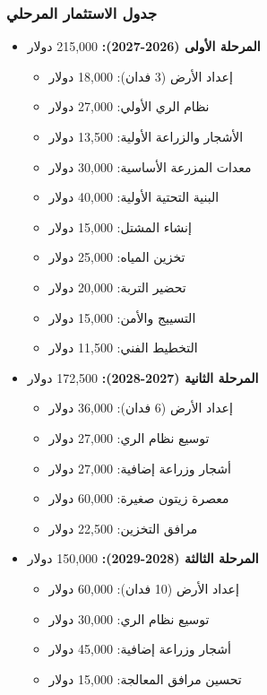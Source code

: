 \subsubsection{جدول الاستثمار المرحلي}
\begin{itemize}
    \item \textbf{المرحلة الأولى (2026-2027):} 215,000 دولار
    \begin{itemize}
        \item إعداد الأرض (3 فدان): 18,000 دولار
        \item نظام الري الأولي: 27,000 دولار
        \item الأشجار والزراعة الأولية: 13,500 دولار
        \item معدات المزرعة الأساسية: 30,000 دولار
        \item البنية التحتية الأولية: 40,000 دولار
        \item إنشاء المشتل: 15,000 دولار
        \item تخزين المياه: 25,000 دولار
        \item تحضير التربة: 20,000 دولار
        \item التسييج والأمن: 15,000 دولار
        \item التخطيط الفني: 11,500 دولار
    \end{itemize}
    
    \item \textbf{المرحلة الثانية (2027-2028):} 172,500 دولار
    \begin{itemize}
        \item إعداد الأرض (6 فدان): 36,000 دولار
        \item توسيع نظام الري: 27,000 دولار
        \item أشجار وزراعة إضافية: 27,000 دولار
        \item معصرة زيتون صغيرة: 60,000 دولار
        \item مرافق التخزين: 22,500 دولار
    \end{itemize}
    
    \item \textbf{المرحلة الثالثة (2028-2029):} 150,000 دولار
    \begin{itemize}
        \item إعداد الأرض (10 فدان): 60,000 دولار
        \item توسيع نظام الري: 30,000 دولار
        \item أشجار وزراعة إضافية: 45,000 دولار
        \item تحسين مرافق المعالجة: 15,000 دولار
    \end{itemize}
    

\end{itemize}
